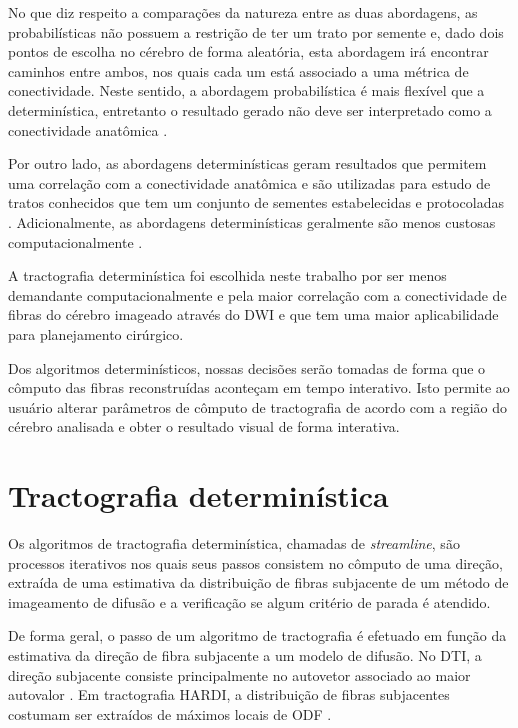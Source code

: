 \documentclass[
    12pt,                %
    oneside,            %
    a4paper,            %
    english,            %
    french,                %
    spanish,            %
    brazil                %
    ]{abntex2}
\begin{document}
No que diz respeito a comparações da natureza entre as duas abordagens, as probabilísticas não possuem a restrição de ter um trato por semente e, dado dois pontos de escolha no cérebro de forma aleatória, esta abordagem irá encontrar caminhos entre ambos, nos quais cada um está associado a uma métrica de conectividade. Neste sentido, a abordagem probabilística é mais flexível que a determinística, entretanto o resultado gerado não deve ser interpretado como a conectividade anatômica \cite{tournier2011}. 

Por outro lado, as abordagens determinísticas geram resultados que permitem uma correlação com a conectividade anatômica e são utilizadas para estudo de tratos conhecidos que tem um conjunto de sementes estabelecidas e protocoladas \cite{tournier2011}. Adicionalmente, as abordagens determinísticas geralmente são menos custosas computacionalmente \cite{DTI_Handbook}.

A tractografia determinística foi escolhida neste trabalho por ser menos demandante computacionalmente e pela maior correlação com a conectividade de fibras do cérebro imageado através do DWI e que tem uma maior aplicabilidade para planejamento cirúrgico.

Dos algoritmos determinísticos, nossas decisões serão tomadas de forma que o cômputo das fibras reconstruídas aconteçam em tempo interativo. Isto permite ao usuário alterar parâmetros de cômputo de tractografia de acordo com a região do cérebro analisada e obter o resultado visual de forma  interativa.

\section {Tractografia determinística}
\label{sec::tractografia_deterministica}

Os algoritmos de tractografia determinística, chamadas de \textit{streamline}, são processos iterativos nos quais seus passos consistem no cômputo de uma direção, extraída de uma estimativa da distribuição de fibras subjacente de um método de imageamento de difusão e a verificação se algum critério de parada é atendido.

De forma geral, o passo de um algoritmo de tractografia é efetuado em função da estimativa da direção de fibra subjacente a um modelo de difusão. No DTI, a direção subjacente consiste principalmente no autovetor associado ao maior autovalor \cite{Weinstein1999, basser2000}. Em tractografia HARDI, a distribuição de fibras subjacentes costumam ser extraídos de máximos locais de ODF \cite{descoteaux2007, SCHILLING2019194}.
\end{document}
